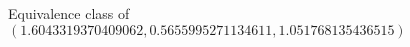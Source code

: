 \documentclass[preview]{standalone}
\begin{document}
\begin{center}
Equivalence class of $(1.6043319370409062, 0.5655995271134611, 1.051768135436515)$
\end{center}
\end{document}
